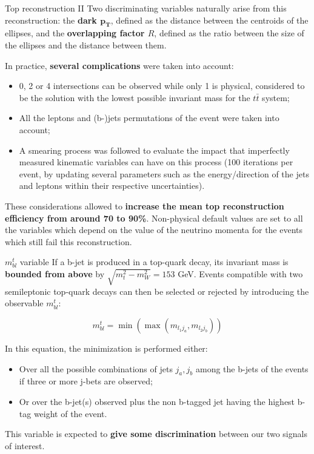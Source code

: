 \documentclass[8pt]{beamer}
\begin{document}
\begin{frame}{Top reconstruction II}
\justifying
Two discriminating variables naturally arise from this reconstruction: the \textbf{dark $\bm{p_T}$}, defined as the distance between the centroids of the ellipses, and the \textbf{overlapping factor $R$}, defined as the ratio between the size of the ellipses and the distance between them. \vfill

In practice, \textbf{several complications} were taken into account:
\begin{itemize}
\justifying
\item 0, 2 or 4 intersections can be observed while only 1 is physical, considered to be the solution with the lowest possible invariant mass for the $t \bar t$ system;
\item All the leptons and (b-)jets permutations of the event were taken into account;
\item A \alert{smearing process} was followed to evaluate the impact that imperfectly measured kinematic variables can have on this process (100 iterations per event, by updating several parameters such as the energy/direction of the jets and leptons within their respective uncertainties).
\end{itemize} \vfill

These considerations allowed to \textbf{increase the mean top reconstruction efficiency from around 70 to 90\%}. Non-physical default values are set to all the variables which depend on the value of the neutrino momenta for the events which still fail this reconstruction. \vfill
\end{frame}

\begin{frame}{$m_{bl}^t$ variable}
\justifying
If a b-jet is produced in a top-quark decay, its invariant mass is \textbf{bounded from above} by $\sqrt{m_t^2 - m_{W}^2} = 153$ GeV. Events compatible with two semileptonic top-quark decays can then be selected or rejected by introducing the observable $m_{bl}^t$: \vfill

\begin{equation*}
m_{bl}^t = \min \left (\max(m_{l_1 j_a}, m_{l_2 j_b}) \right)
\end{equation*} \vfill

In this equation, the minimization is performed either:
\begin{itemize}
\justifying
\item Over all the possible combinations of jets {$j_a, j_b$} among the b-jets of the events if three or more j-bets are observed;
\item Or over the b-jet(s) observed plus the non b-tagged jet having the highest b-tag weight of the event.
\end{itemize} \vfill 

This variable is expected to \textbf{give some discrimination} between our two signals of interest. \vfill
\end{frame}
\end{document}
